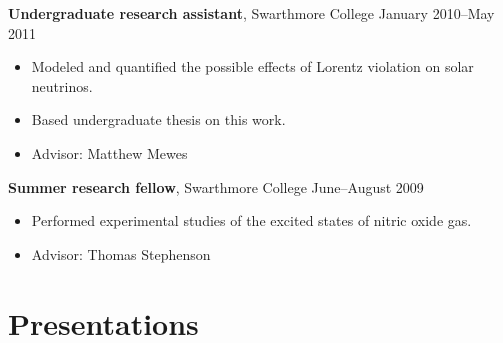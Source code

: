 \documentclass[letterpaper,10pt]{article}
\newcommand{\entry}[3]{\vspace{.5em plus .1em minus .1em}\textbf{#1}, #2 \hfill #3}
\begin{document}
\entry{Undergraduate research assistant}{Swarthmore College}{January 2010--May 2011}

\begin{itemize}
  \item Modeled and quantified the possible effects of Lorentz violation on solar neutrinos.
  \item Based undergraduate thesis on this work.
  \item Advisor: Matthew Mewes
\end{itemize}

\entry{Summer research fellow}{Swarthmore College}{June--August 2009}

\begin{itemize}
  \item Performed experimental studies of the excited states of nitric oxide gas.
  \item Advisor: Thomas Stephenson
\end{itemize}

\pagebreak


\nocite{*}
{\raggedright\printbibliography[heading=bibintoc, title={Publications}]}


\section{Presentations}
\end{document}
